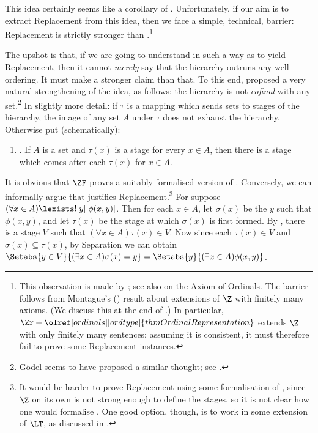 \documentclass[../../../include/open-logic-section]{subfiles}
\begin{document}
This idea certainly seems like a corollary of \stagesinex.
Unfortunately, if our aim is to extract Replacement from this idea,
then we face a simple, technical, barrier: Replacement is strictly stronger than
.\footnote{This observation is made by 
\citet[\S13.2]{Potter2004}; see also \citet{IncurvatiThesis} on the Axiom of
Ordinals. The barrier follows from Montague's (\citeyear{Montague1961}) result about extensions of $\Z$ with finitely many axioms. (We discuss this at the end of .) In particular, $\Zr + \olref[ordinals][ordtype]{thmOrdinalRepresentation}$ extends $\Z$ with only finitely many sentences; assuming it is consistent, it must therefore fail to prove some Replacement-instances.} 

The upshot is that, if we are going to understand \stagesinex{} in
such a way as to yield Replacement, then it cannot \emph{merely} say
that the hierarchy outruns any well-ordering. It must make a stronger
claim than that. To this end, \cite{Shoenfield:AST} proposed a very
natural strengthening of the idea, as follows: the hierarchy is not
\emph{cofinal} with any set.\footnote{G\"odel seems to have proposed a
similar thought; see \citet[p.~223]{Potter2004}.} In slightly more detail:
if $\tau$ is a mapping which sends sets to stages of the hierarchy,
the image of any set $A$ under $\tau$ does not exhaust the hierarchy.
Otherwise put (schematically): 
\begin{enumerate}
	\item[] \stagescofin. If $A$ is a set and $\tau(x)$ is a stage for
	every $x \in A$, then there is a stage which comes after each
	$\tau(x)$ for $x \in A$.
\end{enumerate}
It is obvious that $\ZF$ proves a suitably formalised version of
\stagescofin. Conversely, we can informally argue that \stagescofin{}
justifies Replacement.\footnote{It would be harder to prove
Replacement using some formalisation of \stagescofin, since $\Z$ on
its own is not strong enough to define the stages, so it is not clear
how one would formalise \stagescofin. One good option, though, is to
work in some extension of $\LT$, as discussed in .} For suppose $(\forall x \in A)\lexists![y][\phi(x,y)]$. Then for each $x \in A$, let $\sigma(x)$ be the $y$ such
that $\phi(x,y)$, and let $\tau(x)$ be the stage at which $\sigma(x)$
is first formed. By \stagescofin, there is a stage $V$ such that
$(\forall x \in A)\tau(x)\in V$. Now since each $\tau(x) \in V$ and
$\sigma(x) \subseteq \tau(x)$, by Separation we can obtain $\Setabs{y
\in V}{(\exists x \in A)\sigma(x) = y} = \Setabs{y}{(\exists x \in
A)\phi(x,y)}$.
\end{document}
